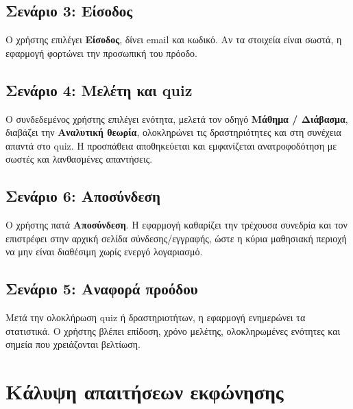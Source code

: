 \documentclass[a4paper]{article}
\begin{document}
\subsection{Σενάριο 3: Είσοδος}

Ο χρήστης επιλέγει \textbf{Είσοδος}, δίνει email και κωδικό. Αν τα στοιχεία είναι σωστά, η εφαρμογή φορτώνει την προσωπική του πρόοδο.

\subsection{Σενάριο 4: Μελέτη και quiz}

Ο συνδεδεμένος χρήστης επιλέγει ενότητα, μελετά τον οδηγό \textbf{Μάθημα / Διάβασμα}, διαβάζει την \textbf{Αναλυτική θεωρία}, ολοκληρώνει τις δραστηριότητες και στη συνέχεια απαντά στο quiz. Η προσπάθεια αποθηκεύεται και εμφανίζεται ανατροφοδότηση με σωστές και λανθασμένες απαντήσεις.

\subsection{Σενάριο 6: Αποσύνδεση}

Ο χρήστης πατά \textbf{Αποσύνδεση}. Η εφαρμογή καθαρίζει την τρέχουσα συνεδρία και τον επιστρέφει στην αρχική σελίδα σύνδεσης/εγγραφής, ώστε η κύρια μαθησιακή περιοχή να μην είναι διαθέσιμη χωρίς ενεργό λογαριασμό.

\subsection{Σενάριο 5: Αναφορά προόδου}

Μετά την ολοκλήρωση quiz ή δραστηριοτήτων, η εφαρμογή ενημερώνει τα στατιστικά. Ο χρήστης βλέπει επίδοση, χρόνο μελέτης, ολοκληρωμένες ενότητες και σημεία που χρειάζονται βελτίωση.

\section{Κάλυψη απαιτήσεων εκφώνησης}
\end{document}
